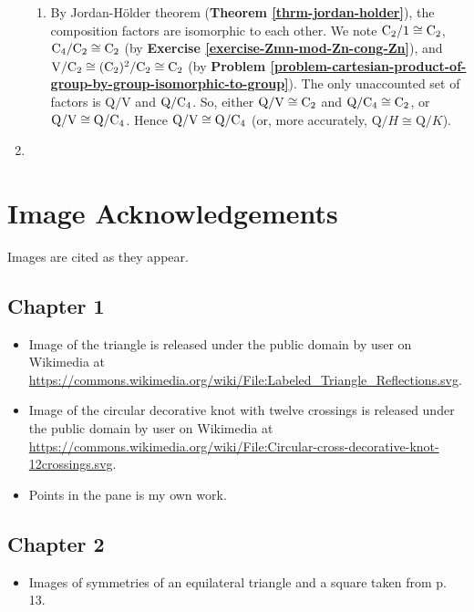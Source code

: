 \begin{enumerate}
\begin{enumerate}[label=(\roman*)]
        \item By Jordan-H\"older theorem (\textbf{Theorem \ref{thrm-jordan-holder}}), the composition factors are isomorphic to each other. We note $\mathrm{C}_{2} / 1 \cong \mathrm{C}_{2}$, $\mathrm{C}_{4} / \mathrm{C}_{2} \cong \mathrm{C}_{2}$ (by \textbf{Exercise \ref{exercise-Zmn-mod-Zn-cong-Zn}}), and $\mathrm{V} / \mathrm{C}_{2} \cong (\mathrm{C}_{2})^2 / \mathrm{C}_{2} \cong \mathrm{C}_{2}$ (by \textbf{Problem \ref{problem-cartesian-product-of-group-by-group-isomorphic-to-group}}). The only unaccounted set of factors is $\mathrm{Q}/\mathrm{V}$ and $\mathrm{Q}/\mathrm{C}_{4}$. So, either $\mathrm{Q}/\mathrm{V} \cong \mathrm{C}_{2}$ and $\mathrm{Q}/\mathrm{C}_{4} \cong \mathrm{C}_{2}$, or $\mathrm{Q}/\mathrm{V} \cong \mathrm{Q}/\mathrm{C}_{4}$. Hence $\mathrm{Q}/\mathrm{V} \cong \mathrm{Q}/\mathrm{C}_{4}$ (or, more accurately, $\mathrm{Q}/H \cong \mathrm{Q}/K$).
    \end{enumerate}
    
    \item %
\end{enumerate}

\chapter*{Image Acknowledgements}
Images are cited as they appear.

\section*{Chapter 1}
\begin{itemize}
    \item Image of the triangle is released under the public domain by user  on Wikimedia at \url{https://commons.wikimedia.org/wiki/File:Labeled_Triangle_Reflections.svg}.
    \item Image of the circular decorative knot with twelve crossings is released under the public domain by user  on Wikimedia at \url{https://commons.wikimedia.org/wiki/File:Circular-cross-decorative-knot-12crossings.svg}.
    \item Points in the pane is my own work.
\end{itemize}
\section*{Chapter 2}
\begin{itemize}
    \item Images of symmetries of an equilateral triangle and a square taken from \cite{milne_2021} p. 13.
\end{itemize}

